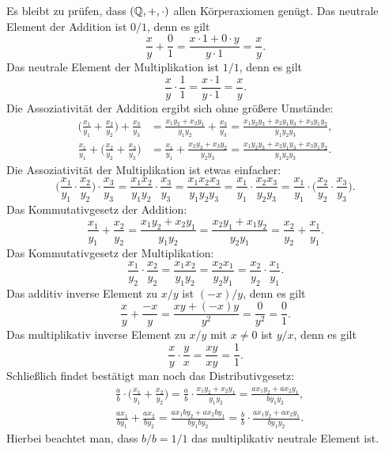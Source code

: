 Es bleibt zu prüfen, dass $(\mathbb Q,+,\cdot)$ allen Körperaxiomen genügt.
Das neutrale Element der Addition ist $0/1$, denn es gilt
\[\frac{x}{y}+\frac{0}{1} = \frac{x\cdot 1+0\cdot y}{y\cdot 1} = \frac{x}{y}.\]
Das neutrale Element der Multiplikation ist $1/1$, denn es gilt
\[\frac{x}{y}\cdot\frac{1}{1} = \frac{x\cdot 1}{y\cdot 1} = \frac{x}{y}.\]
Die Assoziativität der Addition ergibt sich ohne größere Umstände:
\begin{align*}
\bigg(\frac{x_1}{y_1}+\frac{x_2}{y_2}\bigg)+\frac{x_3}{y_3}
&= \frac{x_1y_2+x_2y_1}{y_1y_2} + \frac{x_3}{y_3}
= \frac{x_1y_2y_3+x_2y_1y_3+x_3y_1y_2}{y_1y_2y_3},\\
\frac{x_1}{y_1}+\bigg(\frac{x_2}{y_2}+\frac{x_3}{y_3}\bigg)
&= \frac{x_1}{y_1}+\frac{x_2y_3+x_3y_2}{y_2y_3}
= \frac{x_1y_2y_3+x_2y_1y_3+x_3y_1y_2}{y_1y_2y_3}.
\end{align*}
Die Assoziativität der Multiplikation ist etwas einfacher:
\[\bigg(\frac{x_1}{y_1}\cdot\frac{x_2}{y_2}\bigg)\cdot\frac{x_3}{y_3}
= \frac{x_1x_2}{y_1y_2}\cdot\frac{x_3}{y_3} = \frac{x_1x_2x_3}{y_1y_2y_3}
= \frac{x_1}{y_1}\cdot\frac{x_2x_3}{y_2y_3}
= \frac{x_1}{y_1}\cdot\bigg(\frac{x_2}{y_2}\cdot\frac{x_3}{y_3}\bigg).\]
Das Kommutativgesetz der Addition:
\[\frac{x_1}{y_1}+\frac{x_2}{y_2} = \frac{x_1y_2+x_2y_1}{y_1y_2}
= \frac{x_2y_1+x_1y_2}{y_2y_1}
= \frac{x_2}{y_2}+\frac{x_1}{y_1}.\]
Das Kommutativgesetz der Multiplikation:
\[\frac{x_1}{y_2}\cdot\frac{x_2}{y_2}
= \frac{x_1x_2}{y_1y_2} = \frac{x_2x_1}{y_2y_1}
= \frac{x_2}{y_2}\cdot\frac{x_1}{y_1}.\]
Das additiv inverse Element zu $x/y$ ist $(-x)/y$, denn es gilt
\[\frac{x}{y}+\frac{-x}{y} = \frac{xy+(-x)y}{y^2}
= \frac{0}{y^2} = \frac{0}{1}.\]
Das multiplikativ inverse Element zu $x/y$ mit $x\ne 0$
ist $y/x$, denn es gilt
\[\frac{x}{y}\cdot\frac{y}{x} = \frac{xy}{xy} = \frac{1}{1}.\]
Schließlich findet bestätigt man noch das Distributivgesetz:
\begin{align*}
&\frac{a}{b}\cdot\bigg(\frac{x_1}{y_1}+\frac{x_2}{y_2}\bigg)
= \frac{a}{b}\cdot\frac{x_1y_2+x_2y_1}{y_1y_2}
= \frac{ax_1y_2+ax_2y_1}{by_1y_2},\\
&\frac{ax_1}{by_1}+\frac{ax_2}{by_2}
= \frac{ax_1by_2+ax_2by_1}{by_1by_2}
= \frac{b}{b}\cdot\frac{ax_1y_2+ax_2y_1}{by_1y_2}.
\end{align*}
Hierbei beachtet man, dass $b/b=1/1$ das multiplikativ
neutrale Element ist.\;\qedsymbol

